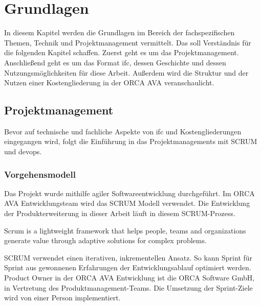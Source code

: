 \chapter{Grundlagen}
\label{c:basics}
In diesem Kapitel werden die Grundlagen im Bereich der fachspezifischen Themen, Technik und Projektmanagement vermittelt. Das soll Verständnis für die folgenden Kapitel schaffen. Zuerst geht es um das Projektmanagement. Anschließend geht es um das Format \ac{ifc}, dessen Geschichte und dessen Nutzungsmöglichkeiten für diese Arbeit. Außerdem wird die Struktur und der Nutzen einer Kostengliederung in der ORCA AVA veranschaulicht.

\section{Projektmanagement}
\label{c:basics:project-management}
Bevor auf technische und fachliche Aspekte von \ac{ifc} und Kostengliederungen eingegangen wird, folgt die Einführung in das Projektmanagements mit SCRUM und \ac{devops}.

\subsection{Vorgehensmodell}
\label{c:basics:project-management:procedure_model}
Das Projekt wurde mithilfe agiler Softwareentwicklung durchgeführt. Im ORCA AVA Entwicklungsteam wird das SCRUM Modell verwendet. Die Entwicklung der Produkterweiterung in dieser Arbeit läuft in diesem SCRUM-Prozess.

\begin{definition}[Scrum]
	\glqq Scrum is a lightweight framework that helps people, teams and organizations generate value through adaptive solutions for complex problems. \grqq{} \citep[p.~3]{scrum_2020}
\end{definition}

SCRUM verwendet einen iterativen, inkrementellen Ansatz. So kann Sprint für Sprint aus gewonnenen Erfahrungen der Entwicklungsablauf optimiert werden. \citep{scrum_2020} Product Owner in der ORCA AVA Entwicklung ist die \glqq ORCA Software GmbH\grqq{}, in Vertretung des Produktmanagement-Teams. Die Umsetzung der Sprint-Ziele wird von einer Person implementiert.

